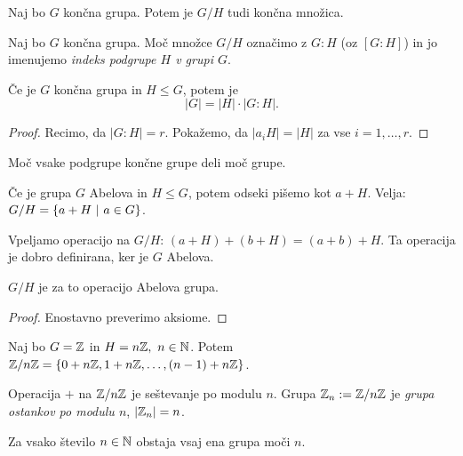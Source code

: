 \begin{opomba}
    Naj bo $G$ končna grupa. Potem je $G/H$ tudi končna množica.
\end{opomba}

\begin{definicija}
    Naj bo $G$ končna grupa. Moč množce $G/H$ označimo z $G:H$ (oz $[G:H]$) in jo imenujemo \emph{indeks podgrupe $H$ v grupi $G$}.
\end{definicija}

\begin{izrek}
    Če je $G$ končna grupa in $H \leq G$, potem je 
    $$|G| = |H| \cdot |G:H|.$$
\end{izrek}

\begin{proof}
    Recimo, da $|G:H| = r$. Pokažemo, da $|a_iH| = |H|$ za vse $i = 1, \ldots, r$.
\end{proof}

\begin{posledica}
    Moč vsake podgrupe končne grupe deli moč grupe.
\end{posledica}

\begin{opomba}
    Če je grupa $G$ Abelova in $H \leq G$, potem odseki pišemo kot $a + H$. Velja: $G/H = \left\{a+H \ | \ a \in G\right\}$.

    Vpeljamo operacijo na $G/H$: $(a+H) + (b+H) = (a + b) + H$. Ta operacija je dobro definirana, ker je $G$ Abelova.
\end{opomba}

\begin{trditev}
    $G/H$ je za to operacijo Abelova grupa.
\end{trditev}

\begin{proof}
    Enostavno preverimo aksiome.
\end{proof}

\begin{primer}
    Naj bo $G = \mathbb{Z}$ in $H = n\mathbb{Z}, \ n \in \mathbb{N}$. Potem $\mathbb{Z}/{n\mathbb{Z}} = \left\{0 + n\mathbb{Z}, 1 + n\mathbb{Z}, \ldots, (n-1) + n\mathbb{Z}\right\}$.

    Operacija $+$ na $\mathbb{Z}/{n\mathbb{Z}}$ je seštevanje po modulu $n$. Grupa $\mathbb{Z}_n := \mathbb{Z}/{n\mathbb{Z}}$ je \emph{grupa ostankov po modulu $n$}, $|\mathbb{Z}_n| = n$.
\end{primer}
\begin{posledica}
    Za vsako število $n \in \mathbb{N}$ obstaja vsaj ena grupa moči $n$.
\end{posledica}


